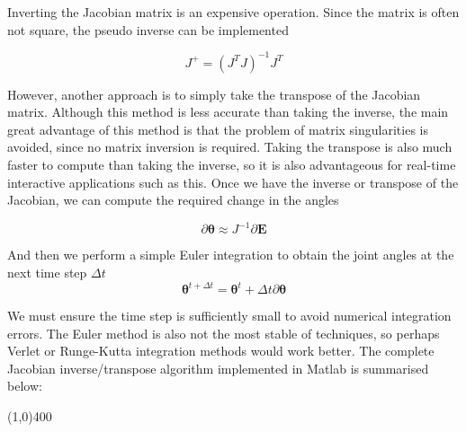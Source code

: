 \documentclass[paper=a4, fontsize=11pt]{scrartcl} %
\numberwithin{equation}{section} %
\numberwithin{figure}{section} %
\numberwithin{table}{section} %
\newcommand{\vect}[1]{\mathbf{#1}}
\newcommand{\params}{\boldsymbol{\theta}}
\begin{document}
Inverting the Jacobian matrix is an expensive operation. Since the matrix is often not square, the pseudo inverse can be implemented

\begin{equation}
J^+ = (J^TJ)^{-1}J^T
\end{equation}

However, another approach is to simply take the transpose of the Jacobian matrix. Although this method is less accurate than taking the inverse, the main great advantage of this method is that the problem of matrix singularities is avoided, since no matrix inversion is required. Taking the transpose is also much faster to compute than taking the inverse, so it is also advantageous for real-time interactive applications such as this. Once we have the inverse or transpose of the Jacobian, we can compute the required change in the angles

\begin{equation}
\partial \params \approx J^{-1} \partial \vect{E}
\end{equation}

And then we perform a simple Euler integration to obtain the joint angles at the next time step $\Delta t$
\vspace{1mm}
\begin{equation}
\params^{t+\Delta t} = \params^t + \Delta t \partial \params
\end{equation}

We must ensure the time step is sufficiently small to avoid numerical integration errors. The Euler method is also not the most stable of techniques, so perhaps Verlet or Runge-Kutta integration methods would work better. The complete Jacobian inverse/transpose algorithm implemented in Matlab is summarised below:
\vspace{-2mm}
\begin{center}
\line(1,0){400}
\end{center}
\end{document}
